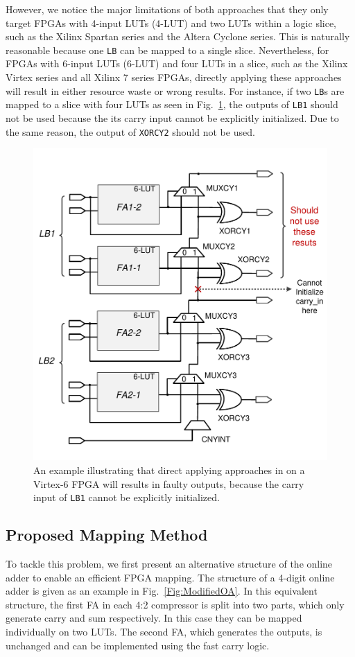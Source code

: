 \documentclass[conference]{IEEEtran}
\begin{document}
However, we notice the major limitations of both approaches that they only target FPGAs with 4-input LUTs (4-LUT) and two LUTs within a logic slice, such as the Xilinx Spartan series and the Altera Cyclone series. This is naturally reasonable because one \texttt{LB} can be mapped to a single slice. Nevertheless, for FPGAs with 6-input LUTs (6-LUT) and four LUTs in a slice, such as the Xilinx Virtex series and all Xilinx 7 series FPGAs, directly applying these approaches will result in either resource waste or wrong results. For instance, if two \texttt{LB}s are mapped to a slice with four LUTs as seen in Fig.~\ref{Fig:PreWorkVirtex6}, the outputs of \texttt{LB1} should not be used because the its carry input cannot be explicitly initialized. Due to the same reason, the output of \texttt{XORCY2} should not be used.
%
\begin{figure}[tbp]
	\centering
	\includegraphics[width=.45\textwidth]{./Figures/SDadder_FastCarry_PreviousWork2.pdf}
	\vspace{-2ex}
	\caption{An example illustrating that direct applying approaches in \cite{FPT09RA} on a Virtex-6 FPGA will results in faulty outputs, because the carry input of \texttt{LB1} cannot be explicitly initialized.}
	\label{Fig:PreWorkVirtex6}
    \vspace{-2ex}
\end{figure}

\subsection{Proposed Mapping Method}
To tackle this problem, we first present an alternative structure of the online adder to enable an efficient FPGA mapping. The structure of a 4-digit online adder is given as an example in Fig.~\ref{Fig:ModifiedOA}. In this equivalent structure, the first FA in each 4:2 compressor is split into two parts, which only generate carry and sum respectively. In this case they can be mapped individually on two LUTs. The second FA, which generates the outputs, is unchanged and can be implemented using the fast carry logic.
\end{document}

